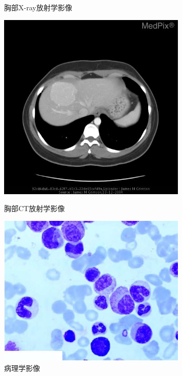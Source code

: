 \begin{figure}[htbp]
\begin{minipage}{0.5\linewidth}
		\caption{\label{xray}胸部X-ray放射学影像} 	
	\end{minipage}	
    \begin{minipage}{0.5\linewidth}
		\centering	
		\includegraphics[width=0.8\textwidth]{Fig/myfig/chapter5/data_radct.jpg}  %
		\caption{\label{ct}胸部CT放射学影像} 	
	\end{minipage}
    \begin{minipage}{0.5\linewidth}
		\centering	
		\includegraphics[width=0.8\textwidth]{Fig/myfig/chapter5/data_path.jpg}  %
		\caption{\label{path}病理学影像} 	
	\end{minipage}
\end{figure}

